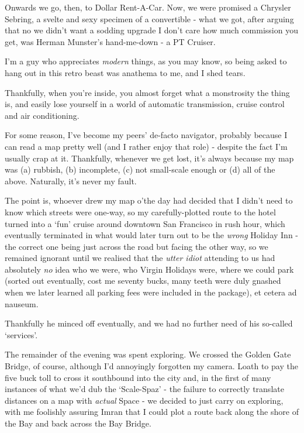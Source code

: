 \documentclass[a5paper,10pt,titlepage,draft]{book}
\begin{document}
Onwards we go, then, to Dollar Rent-A-Car.  Now, we were promised a Chrysler Sebring, a svelte and sexy specimen of a convertible - what we got, after arguing that no we didn't want a sodding upgrade I don't care how much commission you get, was Herman Munster's hand-me-down - a PT Cruiser.

I'm a guy who appreciates \emph{modern} things, as you may know, so being asked to hang out in this retro beast was anathema to me, and I shed tears.

Thankfully, when you're inside, you almost forget what a monstrosity the thing is, and easily lose yourself in a world of automatic transmission, cruise control and air conditioning.

For some reason, I've become my peers' de-facto navigator, probably because I can read a map pretty well (and I rather enjoy that role) - despite the fact I'm usually crap at it.  Thankfully, whenever we get lost, it's always because my map was (a) rubbish, (b) incomplete, (c) not small-scale enough or (d) all of the above.  Naturally, it's never my fault.

The point is, whoever drew my map o'the day had decided that I didn't need to know which streets were one-way, so my carefully-plotted route to the hotel turned into a `fun' cruise around downtown San Francisco in rush hour, which eventually terminated in what would later turn out to be the \emph{wrong} Holiday Inn - the correct one being just across the road but facing the other way, so we remained ignorant until we realised that the \emph{utter idiot} attending to us had absolutely \emph{no} idea who we were, who Virgin Holidays were, where we could park (sorted out eventually, cost me seventy bucks, many teeth were duly gnashed when we later learned all parking fees were included in the package), et cetera ad nauseum.

Thankfully he minced off eventually, and we had no further need of his so-called `services'.

The remainder of the evening was spent exploring.  We crossed the Golden Gate Bridge, of course, although I'd annoyingly forgotten my camera.  Loath to pay the five buck toll to cross it southbound into the city and, in the first of many instances of what we'd dub the `Scale-Spaz' - the failure to correctly translate distances on a map with \emph{actual} Space - we decided to just carry on exploring, with me foolishly assuring Imran that I could plot a route back along the shore of the Bay and back across the Bay Bridge.
\end{document}
